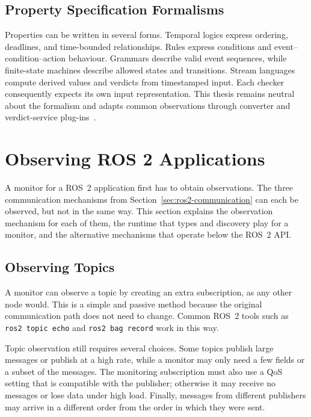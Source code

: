 \subsection{Property Specification Formalisms}

Properties can be written in several forms. Temporal logics express ordering,
deadlines, and time-bounded relationships. Rules express conditions and
event--condition--action behaviour. Grammars describe valid event sequences,
while finite-state machines describe allowed states and transitions. Stream
languages compute derived values and verdicts from timestamped input. Each
checker consequently expects its own input representation. This thesis remains
neutral about the formalism and adapts common observations through converter
and verdict-service plug-ins~\cite{leucker2009brief}.

\section{Observing ROS 2 Applications}\label{sec:observing-ros2}

A monitor for a ROS~2 application first has to obtain observations. The three
communication mechanisms from Section~\ref{sec:ros2-communication} can each be
observed, but not in the same way. This section explains the observation mechanism for each of them,
the runtime that types and discovery play for a monitor, and the alternative
mechanisms that operate below the ROS~2 API.

\subsection{Observing Topics}

A monitor can observe a topic by creating an extra subscription, as any other
node would. This is a simple and passive method because the original
communication path does not need to change. Common ROS~2 tools such as
\texttt{ros2 topic echo} and \texttt{ros2 bag record} work in this way.

Topic observation still requires several choices. Some topics publish large
messages or publish at a high rate, while a monitor may only need a few fields
or a subset of the messages. The monitoring subscription must also use a QoS
setting that is compatible with the publisher; otherwise it may receive no
messages or lose data under high load. Finally, messages from different
publishers may arrive in a different order from the order in which they were
sent.

